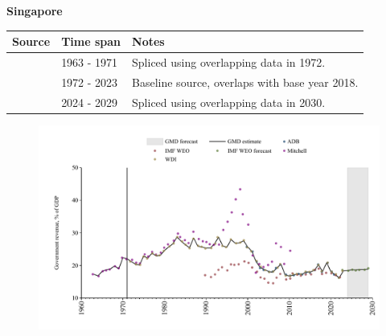 \documentclass[12pt,a4paper,landscape]{article}
\begin{document}
\begin{adjustbox}{max totalsize={\paperwidth}{\paperheight},center}
\begin{minipage}[t][\textheight][t]{\textwidth}
\vspace*{0.5cm}
{}
\begin{center}
{\Large\bfseries Singapore}
\end{center}
\vspace{0.5cm}
\begin{table}[H]
\centering
\small
\begin{tabular}{|l|l|l|}
\hline
\textbf{Source} & \textbf{Time span} & \textbf{Notes} \\
\hline
\rowcolor{white}\cite{Mitchell}& 1963 - 1971 &Spliced using overlapping data in 1972.\\
\rowcolor{lightgray}\cite{WDI}& 1972 - 2023 &Baseline source, overlaps with base year 2018.\\
\rowcolor{white}\cite{IMF_WEO_forecast}& 2024 - 2029 &Spliced using overlapping data in 2030.\\
\hline
\end{tabular}
\end{table}
\begin{figure}[H]
\centering
\includegraphics[width=\textwidth,height=0.6\textheight,keepaspectratio]{graphs/SGP_govrev_GDP.pdf}
\end{figure}
\end{minipage}
\end{adjustbox}
\end{document}
